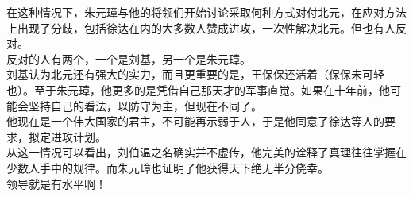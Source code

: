 \begin{multicols}{\theparacolNo}
在这种情况下，朱元璋与他的将领们开始讨论采取何种方式对付北元，在应对方法上出现了分歧，包括徐达在内的大多数人赞成进攻，一次性解决北元。但也有人反对。\\

反对的人有两个，一个是刘基，另一个是朱元璋。\\

刘基认为北元还有强大的实力，而且更重要的是，王保保还活着（保保未可轻也）。至于朱元璋，他更多的是凭借自己那天才的军事直觉。如果在十年前，他可能会坚持自己的看法，以防守为主，但现在不同了。\\

他现在是一个伟大国家的君主，不可能再示弱于人，于是他同意了徐达等人的要求，拟定进攻计划。\\

从这一情况可以看出，刘伯温之名确实并不虚传，他完美的诠释了真理往往掌握在少数人手中的规律。而朱元璋也证明了他获得天下绝无半分侥幸。\\

领导就是有水平啊！\\
\ifnum{}
	\end{multicols}
\fi
\newpage
